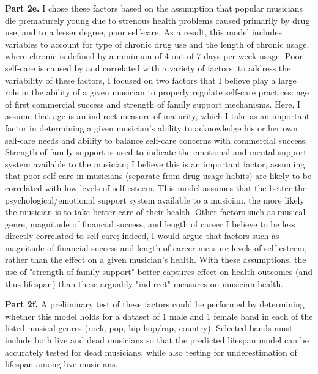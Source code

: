 \documentclass[letterpaper,12pt]{article}
\theoremstyle{definition}
\begin{document}
\noindent\newline\textbf{Part 2e.} I chose these factors based on the assumption that popular musicians die prematurely young due to strenous health problems caused primarily by drug use, and to a lesser degree, poor self-care. As a result, this model includes variables to account for type of chronic drug use and the length of chronic usage, where chronic is defined by a minimum of 4 out of 7 days per week usage. Poor self-care is caused by and correlated with a variety of factors: to address the variability of these factors, I focused on two factors that I believe play a large role in the ability of a given musician to properly regulate self-care practices: age of first commercial success and strength of family support mechanisms. Here, I assume that age is an indirect measure of maturity, which I take as an important factor in determining a given musician's ability to acknowledge his or her own self-care needs and ability to balance self-care concerns with commercial success. Strength of family support is used to indicate the emotional and mental support system available to the musician; I believe this is an important factor, assuming that poor self-care in musicians (separate from drug usage habits) are likely to be correlated with low levels of self-esteem. This model assumes that the better the psychological/emotional support system available to a musician, the more likely the musician is to take better care of their health. Other factors such as musical genre, magnitude of financial success, and length of career I believe to be less directly correlated to self-care; indeed, I would argue that factors such as magnitude of financial success and length of career measure levels of self-esteem, rather than the effect on a given musician's health. With these assumptions, the use of "strength of family support" better captures effect on health outcomes (and thus lifespan) than these arguably "indirect" measures on musician health.

\noindent\newline\textbf{Part 2f.} A preliminary test of these factors could be performed by determining whether this model holds for a dataset of 1 male and 1 female band in each of the listed musical genres (rock, pop, hip hop/rap, country). Selected bands must include both live and dead musicians so that the predicted lifespan model can be accurately tested for dead musicians, while also testing for underestimation of lifespan among live musicians.
\end{document}
